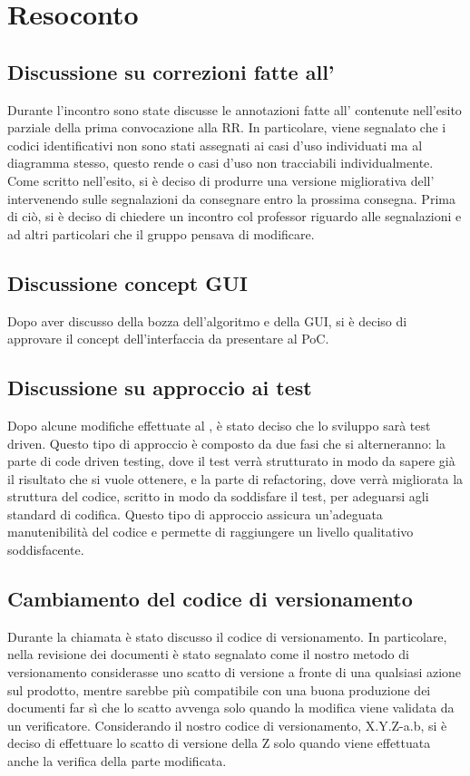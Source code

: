 \newpage


\section{Resoconto}

\subsection{Discussione su correzioni fatte all' \AdR{}}
Durante l'incontro sono state discusse le annotazioni fatte all'\AdR{} 	contenute nell'esito parziale della prima convocazione alla RR. In particolare, viene segnalato che i codici identificativi non sono stati assegnati ai casi d'uso individuati ma al diagramma stesso, questo rende o casi d'uso non tracciabili individualmente. Come scritto nell'esito, si è deciso di produrre una versione migliorativa dell'\AdR{} intervenendo sulle segnalazioni da consegnare entro la prossima consegna. Prima di ciò, si è deciso di chiedere un incontro col professor \Riccardo{} riguardo alle segnalazioni e ad altri particolari che il gruppo pensava di modificare. 

\subsection{Discussione concept GUI}
Dopo aver discusso della bozza dell'algoritmo e della GUI, si è deciso di approvare il concept dell'interfaccia da presentare al PoC. 

\subsection{Discussione su approccio ai test }
Dopo alcune modifiche effettuate al \PdQ{}, è stato deciso che lo sviluppo sarà test driven. Questo tipo di approccio è composto da due fasi che si alterneranno: la parte di code driven testing, dove il test verrà strutturato in modo da sapere già il risultato che si vuole ottenere, e la parte di refactoring, dove verrà migliorata la struttura del codice, scritto in modo da soddisfare il test,  per adeguarsi agli standard di codifica. Questo tipo di approccio assicura un'adeguata manutenibilità del codice e permette di raggiungere un livello qualitativo soddisfacente.

\subsection{Cambiamento del codice di versionamento}
Durante la chiamata è stato discusso il codice di versionamento. In particolare, nella revisione dei documenti è stato segnalato come il nostro metodo di versionamento considerasse uno scatto di versione a fronte di una qualsiasi azione sul prodotto, mentre sarebbe più compatibile con una buona produzione dei documenti far sì che lo scatto avvenga solo quando la modifica viene validata da un verificatore. Considerando il nostro codice di versionamento, X.Y.Z-a.b, si è deciso di effettuare lo scatto di versione della Z solo quando viene effettuata anche la verifica della parte modificata. 

